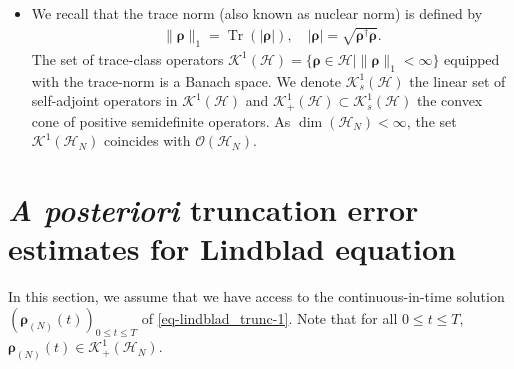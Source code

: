 \documentclass[a4paper,onecolumn,amsmath,amssymb,amsfonts,accepted=2026-03-06]{quantumarticle}
\newcommand{\Id}{\operatorname{\mathbf{Id}}}
\newcommand{\xH}{\mathcal{H}}
\newcommand{\xtr}[1]{\operatorname{Tr}\left(#1 \right)}
\newcommand{\xK}{\mathcal{K}}
\newcommand{\xN}{\mathbb{N}}
\newcommand{\qop}{{\bf q}}
\newcommand{\Pop}{{\bf p}}
\newcommand{\destroy}{{\bf a}}
\newcommand{\create}{{\bf a^\dag}}
\newcommand{\destroyb}{{\bf b}}
\newcommand{\rN}{{\boldsymbol{\rho}_{(N)}}}
\newcommand{\Nop}{\mathbf{N}}
\begin{document}
\begin{itemize}
\begin{align}
        \destroy= \sum_{n=1}^\infty\sqrt{n}\ket{n-1}\bra{n}, \quad \create = \sum_{n=0}^\infty\sqrt{n+1}\ket{n+1}\bra{n}.
    \end{align}
    The position and momentum operators obey the relations
    \begin{align}
    \qop &= \frac{{\destroy + \create}}{\sqrt{2}}, \quad \Pop = \frac{{\destroy - \create}}{i\sqrt{2}},
    \end{align}
    and $\Nop=\create \destroy$ denotes the photon number operator. For a system with two modes, that is $\xH=l^2(\xN)\otimes l^2(\xN)$, the annihilation operator on the first mode ($\destroy \otimes \Id$) and on the second mode ($\Id \otimes \ \destroy$) are denoted by $\destroy$ and $\destroyb$ with a surcharge of notation. 
    \item We recall that the trace norm (also known as nuclear norm) is defined by 
    \begin{align}
        \label{eq_nuclear_norm}
        \|\boldsymbol{\rho}\|_1= \xtr{|\boldsymbol{\rho}|}, \quad |\boldsymbol{\rho}| =\sqrt{\boldsymbol{\rho}^\dag \boldsymbol{\rho}}.
    \end{align}
    The set of trace-class operators $\xK^1(\xH)= \{ \boldsymbol{\rho} \in \xH \mid \|\boldsymbol{\rho}\|_1 <\infty\}$ equipped with the trace-norm is a Banach space. We denote $\xK^1_s(\xH)$ the linear set of self-adjoint operators in $\xK^1(\xH)$ and $\xK^1_+(\xH)\subset \xK^1_s(\xH)$ the convex cone of positive semidefinite operators. As $\dim(\xH_N)<\infty$, the set $\xK^1(\xH_N)$ coincides with $\mathcal{O}(\xH_N)$.
    
\end{itemize}


\section{\textit{A posteriori} truncation error estimates for Lindblad equation}
\label{sec:sec_1}
\label{subsec_spaceestimate}
In this section, we assume that we have access to the continuous-in-time solution $(\rN(t))_{0 \leq t\leq T}$ of \cref{eq-lindblad_trunc-1}. Note that for all $0 \leq t \leq T$, $\rN(t)\in \xK^1_+(\xH_N)$.
\end{document}
